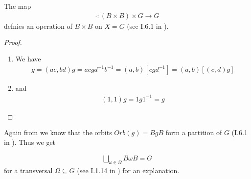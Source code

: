 \documentclass[]{article}
\begin{document}
\begin{theorem*}
    The map
\begin{align*}
    \cdot:(B \times B) \times G \rightarrow G
\end{align*}
defnies an operation of \(B \times B\) on \(X=G\) (see I.6.1 in \cite{jan}).
\end{theorem*}
\begin{proof}
    \begin{enumerate}
        \item We have
        \begin{align*}
            [(a,b)(c,d)]g=(ac,bd)g=acgd^{-1}b^{-1}=(a,b)[cgd^{-1}]=(a,b)[(c,d)g]
        \end{align*}
        \item and 
        \begin{align*}
            (1,1)g=1g1^{-1}=g
        \end{align*}
    \end{enumerate}
\end{proof}

Again from \cite{jan} we know that the orbits \(Orb(g)=BgB\) form a partition of \(G\) (I.6.1 in \cite{jan}). Thus we get

\begin{align}
    \bigsqcup_{\omega \in \Omega} B \omega B = G
    \label{eq:partition}
\end{align}
for a transversal \(\Omega \subseteq G\) (see I.1.14 in \cite{jan}) for an explanation.
\end{document}
